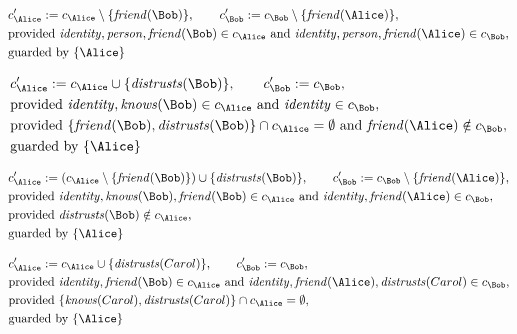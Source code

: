 \begin{align*}
&
c'_
{
\Alice
}
 := 
c_
{
\Alice
}
 \setminus 
\{
\mathit{\detokenize{
friend
}}
(
\Bob
)
\}
, \qquad 
c'_
{
\Bob
}
 := 
c_
{
\Bob
}
 \setminus 
\{
\mathit{\detokenize{
friend
}}
(
\Alice
)
\}
,\\
&
\text{provided } 
\mathit{\detokenize{
identity
}}
,
\mathit{\detokenize{
person
}}
,
\mathit{\detokenize{
friend
}}
(
\Bob
)
 \in c_
{
\Alice
}
 \text{ and } 
\mathit{\detokenize{
identity
}}
,
\mathit{\detokenize{
person
}}
,
\mathit{\detokenize{
friend
}}
(
\Alice
)
 \in c_
{
\Bob
}
,\\
&
\text{guarded by } \{
\Alice
\}
\end{align*}

\begin{align*}
&
c'_
{
\Alice
}
 := 
c_
{
\Alice
}
 \cup 
\{
\mathit{\detokenize{
distrusts
}}
(
\Bob
)
\}
, \qquad 
c'_
{
\Bob
}
 := 
c_
{
\Bob
}
,\\
&
\text{provided } 
\mathit{\detokenize{
identity
}}
,
\mathit{\detokenize{
knows
}}
(
\Bob
)
 \in c_
{
\Alice
}
 \text{ and } 
\mathit{\detokenize{
identity
}}
 \in c_
{
\Bob
}
,\\
&
\text{provided } 
\{
\mathit{\detokenize{
friend
}}
(
\Bob
)
,
\mathit{\detokenize{
distrusts
}}
(
\Bob
)
\}
 \cap c_
{
\Alice
}
 = \emptyset
 \text{ and } 
\mathit{\detokenize{
friend
}}
(
\Alice
)
 \notin c_
{
\Bob
}
,\\
&
\text{guarded by } \{
\Alice
\}
\end{align*}

\begin{align*}
&
c'_
{
\Alice
}
 := 
(c_
{
\Alice
}
 \setminus 
\{
\mathit{\detokenize{
friend
}}
(
\Bob
)
\}
) \cup 
\{
\mathit{\detokenize{
distrusts
}}
(
\Bob
)
\}
, \qquad 
c'_
{
\Bob
}
 := 
c_
{
\Bob
}
 \setminus 
\{
\mathit{\detokenize{
friend
}}
(
\Alice
)
\}
,\\
&
\text{provided } 
\mathit{\detokenize{
identity
}}
,
\mathit{\detokenize{
knows
}}
(
\Bob
)
,
\mathit{\detokenize{
friend
}}
(
\Bob
)
 \in c_
{
\Alice
}
 \text{ and } 
\mathit{\detokenize{
identity
}}
,
\mathit{\detokenize{
friend
}}
(
\Alice
)
 \in c_
{
\Bob
}
,\\
&
\text{provided } 
\mathit{\detokenize{
distrusts
}}
(
\Bob
)
 \notin c_
{
\Alice
}
,\\
&
\text{guarded by } \{
\Alice
\}
\end{align*}

\begin{align*}
&
c'_
{
\Alice
}
 := 
c_
{
\Alice
}
 \cup 
\{
\mathit{\detokenize{
distrusts
}}
(
Carol
)
\}
, \qquad 
c'_
{
\Bob
}
 := 
c_
{
\Bob
}
,\\
&
\text{provided } 
\mathit{\detokenize{
identity
}}
,
\mathit{\detokenize{
friend
}}
(
\Bob
)
 \in c_
{
\Alice
}
 \text{ and } 
\mathit{\detokenize{
identity
}}
,
\mathit{\detokenize{
friend
}}
(
\Alice
)
,
\mathit{\detokenize{
distrusts
}}
(
Carol
)
 \in c_
{
\Bob
}
,\\
&
\text{provided } 
\{
\mathit{\detokenize{
knows
}}
(
Carol
)
,
\mathit{\detokenize{
distrusts
}}
(
Carol
)
\}
 \cap c_
{
\Alice
}
 = \emptyset
,\\
&
\text{guarded by } \{
\Alice
\}
\end{align*}
